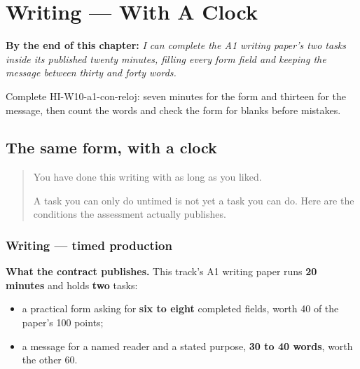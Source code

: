 
\chapter{Writing --- With A Clock}
\label{ch:hi-ghadi-ke-saath}

\begin{chapteropening}
\textbf{By the end of this chapter:} \emph{I can complete the A1 writing paper's two tasks inside its published twenty minutes, filling every form field and keeping the message between thirty and forty words.}

Complete HI-W10-a1-con-reloj: seven minutes for the form and thirteen for the message, then count the words and check the form for blanks before mistakes.
\end{chapteropening}

\section[(timed)]{The same form, with a clock}

\label{lesson:HI-W10-a1-con-reloj}



\begin{quote}
You have done this writing with as long as you liked.

A task you can only do untimed is not yet a task you can do. Here are the conditions the assessment actually publishes.
\end{quote}

\subsection*{Writing — timed production}
\textbf{What the contract publishes.} This track's A1 writing paper runs \textbf{20 minutes} and holds \textbf{two} tasks:

\begin{itemize}
\raggedright
  \item a practical form asking for \textbf{six to eight} completed fields, worth 40 of the paper's 100 points;
  \item a message for a named reader and a stated purpose, \textbf{30 to 40 words}, worth the other 60.
\end{itemize}

